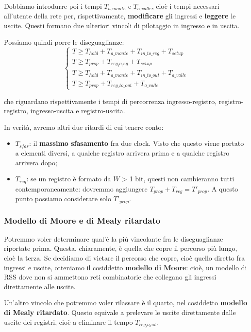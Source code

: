 \documentclass[a4paper,11pt]{article}
\begin{document}
Dobbiamo introdurre poi i tempi $T_{a\_monte}$ e $T_{a\_valle}$, cioè i tempi necessari all'utente della rete per, rispettivamente, \textbf{modificare} gli ingressi e \textbf{leggere} le uscite.
Questi formano due ulteriori vincoli di pilotaggio in ingresso e in uscita.

Possiamo quindi porre le diseguaglianze:
\[
	\begin{cases}
		T \geq T_{hold} + T_{a\_monte} + T_{in\_to\_reg} + T_{setup} \\ 
		T \geq T_{prop} + T_{reg_to_reg} + T_{setup} \\ 
		T \geq T_{hold} + T_{a\_monte} + T_{in\_to\_out} + T_{a\_valle} \\
		T \geq T_{prop} + T_{reg\_to\_out} + T_{a\_valle}
	\end{cases}
\]

che riguardano rispettivamente i tempi di percorrenza ingresso-registro, registro-registro, ingresso-uscita e registro-uscita.

In verità, avremo altri due ritardi di cui tenere conto:
\begin{itemize}
	\item $T_{sfas}$: il \textbf{massimo sfasamento} fra due clock.
		Visto che questo viene portato a elementi diversi, a qualche registro arrivera prima e a qualche registro arrivera dopo;
	\item $T_{reg}$: se un registro è formato da $W$ > 1 bit, questi non cambieranno tutti contemporaneamente: dovremmo aggiungere $T_{prop} + T_{reg} = T'_{prop}$. A questo punto possiamo considerare solo $T'_{prop}$.
\end{itemize}

\subsubsection{Modello di Moore e di Mealy ritardato}
Potremmo voler determinare qual'è la più vincolante fra le diseguaglianze riportate prima.
Questa, chiaramente, è quella che copre il percorso più lungo, cioè la terza.
Se decidiamo di vietare il percorso che copre, cioè quello diretto fra ingressi e uscite, otteniamo il cosiddetto \textbf{modello di Moore}: cioè, un modello di RSS dove non si ammettono reti combinatorie che collegano gli ingressi direttamente alle uscite.

Un'altro vincolo che potremmo voler rilassare è il quarto, nel cosiddetto \textbf{modello di Mealy ritardato}.
Questo equivale a prelevare le uscite direttamente dalle uscite dei registri, cioè a eliminare il tempo $T_{reg_to_out}$.
\end{document}
